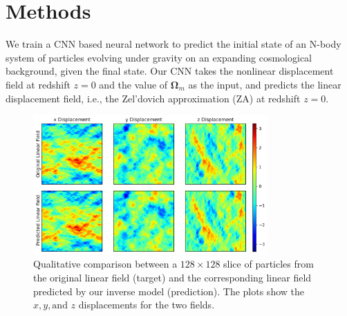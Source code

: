 \documentclass[11pt]{article}
\begin{document}
\section{Methods}

We train a CNN based neural network to predict the initial state of an N-body system of particles evolving under gravity on an expanding cosmological background, given the final state. Our CNN takes the nonlinear displacement field at redshift $z=0$ and the value of $\mathbf{\Omega}_m$ as the input, and predicts the linear displacement field, i.e., the Zel'dovich approximation (ZA) at redshift $z=0$.

\begin{figure}[t!]
\begin{center}
\centerline{\includegraphics[width=0.8\textwidth]{images/slices.png}}
\caption{Qualitative comparison between a $128 \times 128$ slice of particles from the original linear field (target) and the corresponding linear field predicted by our inverse model (prediction). The plots show the $x,y, \text{and } z$ displacements for the two fields.}
\label{slices}
\end{center}
\end{figure}
\end{document}
